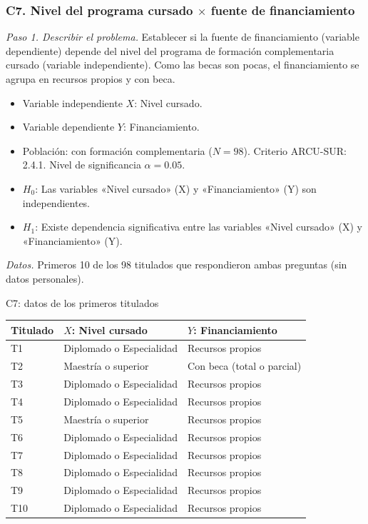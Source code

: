 \subsubsection*{C7. Nivel del programa cursado $\times$ fuente de financiamiento}

\textit{Paso 1. Describir el problema.} Establecer si la fuente de financiamiento (variable dependiente) depende del nivel del programa de formación complementaria cursado (variable independiente). Como las becas son pocas, el financiamiento se agrupa en recursos propios y con beca.

\begin{itemize}[nosep]
  \item Variable independiente $X$: Nivel cursado.
  \item Variable dependiente $Y$: Financiamiento.
  \item Población: con formación complementaria ($N = 98$). Criterio ARCU-SUR: 2.4.1. Nivel de significancia $\alpha = 0.05$.
  \item $H_0$: Las variables «Nivel cursado» (X) y «Financiamiento» (Y) son independientes.
  \item $H_1$: Existe dependencia significativa entre las variables «Nivel cursado» (X) y «Financiamiento» (Y).
\end{itemize}

\textit{Datos.} Primeros 10 de los 98 titulados que respondieron ambas preguntas (sin datos personales).

\begin{mitabla}{C7: datos de los primeros titulados}
\begin{tabular}{lll}
\toprule
Titulado & $X$: Nivel cursado & $Y$: Financiamiento \\
\midrule
T1 & Diplomado o Especialidad & Recursos propios \\
T2 & Maestría o superior & Con beca (total o parcial) \\
T3 & Diplomado o Especialidad & Recursos propios \\
T4 & Diplomado o Especialidad & Recursos propios \\
T5 & Maestría o superior & Recursos propios \\
T6 & Diplomado o Especialidad & Recursos propios \\
T7 & Diplomado o Especialidad & Recursos propios \\
T8 & Diplomado o Especialidad & Recursos propios \\
T9 & Diplomado o Especialidad & Recursos propios \\
T10 & Diplomado o Especialidad & Recursos propios \\
\bottomrule
\end{tabular}
\end{mitabla}


